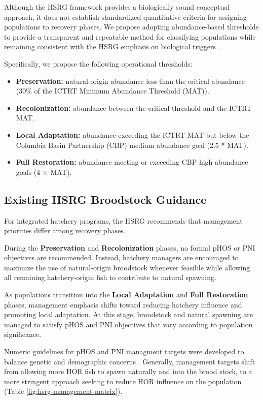 \documentclass[12pt,letterpaper]{article}
\providecommand{\tightlist}{%
  \setlength{\itemsep}{0pt}\setlength{\parskip}{0pt}}
\begin{document}
Although the HSRG framework provides a biologically sound conceptual approach, it does not establish standardized quantitative criteria for assigning populations to recovery phases. We propose adopting abundance-based thresholds to provide a transparent and repeatable method for classifying populations while remaining consistent with the HSRG emphasis on biological triggers \autocite{hsrg_developing_2020}.

Specifically, we propose the following operational thresholds:

\begin{itemize}
\tightlist
\item
  \textbf{Preservation:} natural-origin abundance less than the critical abundance (30\% of the ICTRT Minimum Abundance Threshold (MAT)).
\item
  \textbf{Recolonization:} abundance between the critical threshold and the ICTRT MAT.
\item
  \textbf{Local Adaptation:} abundance exceeding the ICTRT MAT but below the Columbia Basin Partnership (CBP) medium abundance goal (2.5 * MAT).
\item
  \textbf{Full Restoration:} abundance meeting or exceeding CBP high abundance goals (4 × MAT).
\end{itemize}

\subsection{Existing HSRG Broodstock Guidance}\label{existing-hsrg-broodstock-guidance}

For integrated hatchery programs, the HSRG recommends that management priorities differ among recovery phases.

During the \textbf{Preservation} and \textbf{Recolonization} phases, no formal pHOS or PNI objectives are recommended. Instead, hatchery managers are encouraged to maximize the use of natural-origin broodstock whenever feasible while allowing all remaining hatchery-origin fish to contribute to natural spawning.

As populations transition into the \textbf{Local Adaptation} and \textbf{Full Restoration} phases, management emphasis shifts toward reducing hatchery influence and promoting local adaptation. At this stage, broodstock and natural spawning are managed to satisfy pHOS and PNI objectives that vary according to population significance.

Numeric guidelines for pHOS and PNI managment targets were developed to balance genetic and demographic concerns \autocite{hsrg_implementation_2017}. Generally, management targets shift from allowing more HOR fish to spawn naturally and into the brood stock, to a more stringent approach seeking to reduce HOR influence on the population (Table \ref{fig:hsrg-management-matrix}).
\end{document}
